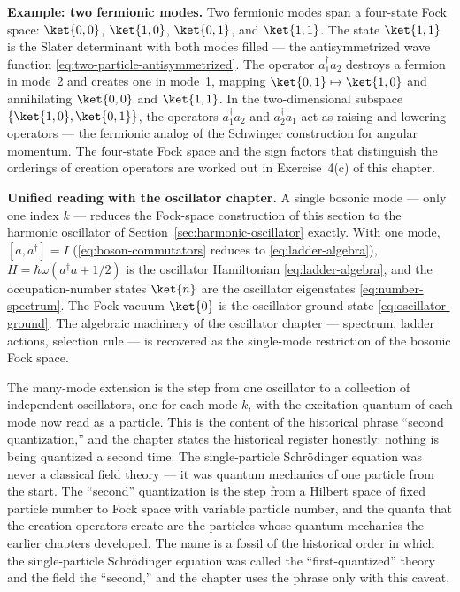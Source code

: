 \medskip\noindent\textbf{Example: two fermionic modes.}
Two fermionic modes span a four-state Fock space: $\ket{0,0}$, $\ket{1,0}$, $\ket{0,1}$, and $\ket{1,1}$. The state $\ket{1,1}$ is the Slater determinant with both modes filled --- the antisymmetrized wave function \eqref{eq:two-particle-antisymmetrized}. The operator $a_1^\dagger a_2$ destroys a fermion in mode~2 and creates one in mode~1, mapping $\ket{0,1} \mapsto \ket{1,0}$ and annihilating $\ket{0,0}$ and $\ket{1,1}$. In the two-dimensional subspace $\{\ket{1,0}, \ket{0,1}\}$, the operators $a_1^\dagger a_2$ and $a_2^\dagger a_1$ act as raising and lowering operators --- the fermionic analog of the Schwinger construction for angular momentum. The four-state Fock space and the sign factors that distinguish the orderings of creation operators are worked out in Exercise~4(c) of this chapter.

\medskip\noindent\textbf{Unified reading with the oscillator chapter.}
A single bosonic mode --- only one index $k$ --- reduces the Fock-space construction of this section to the harmonic oscillator of Section~\ref{sec:harmonic-oscillator} exactly. With one mode, $[a, a^\dagger] = I$ (\eqref{eq:boson-commutators} reduces to \eqref{eq:ladder-algebra}), $H = \hbar\omega(a^\dagger a + 1/2)$ is the oscillator Hamiltonian \eqref{eq:ladder-algebra}, and the occupation-number states $\ket{n}$ are the oscillator eigenstates \eqref{eq:number-spectrum}. The Fock vacuum $\ket{0}$ is the oscillator ground state \eqref{eq:oscillator-ground}. The algebraic machinery of the oscillator chapter --- spectrum, ladder actions, selection rule --- is recovered as the single-mode restriction of the bosonic Fock space.

The many-mode extension is the step from one oscillator to a collection of independent oscillators, one for each mode $k$, with the excitation quantum of each mode now read as a particle. This is the content of the historical phrase ``second quantization,'' and the chapter states the historical register honestly: nothing is being quantized a second time. The single-particle Schr\"odinger equation was never a classical field theory --- it was quantum mechanics of one particle from the start. The ``second'' quantization is the step from a Hilbert space of fixed particle number to Fock space with variable particle number, and the quanta that the creation operators create are the particles whose quantum mechanics the earlier chapters developed. The name is a fossil of the historical order in which the single-particle Schr\"odinger equation was called the ``first-quantized'' theory and the field the ``second,'' and the chapter uses the phrase only with this caveat.

